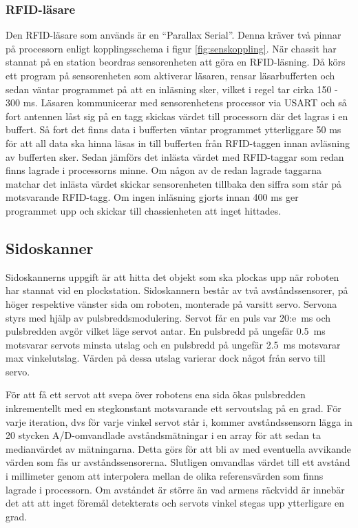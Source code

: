 \subsubsection{RFID-läsare}
Den RFID-läsare som används är en “Parallax Serial”. Denna kräver två pinnar på processorn enligt kopplingsschema i figur \ref{fig:senskoppling}. När chassit har stannat på en station beordras sensorenheten att göra en RFID-läsning. Då körs ett program på sensorenheten som aktiverar läsaren, rensar läsarbufferten och sedan väntar programmet på att en inläsning sker, vilket i regel tar cirka 150 - 300 ms. Läsaren kommunicerar med sensorenhetens processor via USART och så fort antennen låst sig på en tagg skickas värdet till processorn där det lagras i en buffert. Så fort det finns data i bufferten väntar programmet ytterliggare 50 ms för att all data ska hinna läsas in till bufferten från RFID-taggen innan avläsning av bufferten sker. Sedan jämförs det inlästa värdet med RFID-taggar som redan finns lagrade i processorns minne. Om någon av de redan lagrade taggarna matchar det inlästa värdet skickar sensorenheten tillbaka den siffra som står på motsvarande RFID-tagg. Om ingen inläsning gjorts innan 400 ms ger programmet upp och skickar till chassienheten att inget hittades.

\subsection{Sidoskanner}
Sidoskannerns uppgift är att hitta det objekt som ska plockas upp när roboten har stannat vid en plockstation. Sidoskannern består av två avståndssensorer, på höger respektive vänster sida om roboten, monterade på varsitt servo. Servona styrs med hjälp av pulsbreddsmodulering. Servot får en puls var 20:e~ms och pulsbredden avgör vilket läge servot antar. En pulsbredd på ungefär 0.5~ms motsvarar servots minsta utslag och en pulsbredd på ungefär 2.5~ms motsvarar max vinkelutslag. Värden på dessa utslag varierar dock något från servo till servo.

För att få ett servot att svepa över robotens ena sida ökas pulsbredden inkrementellt med en stegkonstant motsvarande ett servoutslag på en grad. För varje iteration, dvs för varje vinkel servot står i, kommer avståndssensorn lägga in 20 stycken A/D-omvandlade avståndsmätningar i en array för att sedan ta medianvärdet av mätningarna. Detta görs för att bli av med eventuella avvikande värden som fås ur avståndssensorerna. Slutligen omvandlas värdet till ett avstånd i millimeter genom att interpolera mellan de olika referensvärden som finns lagrade i processorn. Om avståndet är större än vad armens räckvidd är innebär det att att inget föremål detekterats och servots vinkel stegas upp ytterligare en grad. 

